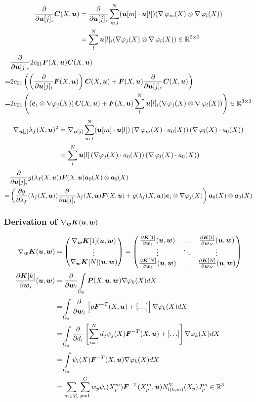 \begin{align*}
	\d{}{\vu[j]_i}\vC(X,\vu) &= \d{}{\vu[j]_i}\suml{m,l}{N} (\vu[m] \cdot \vu[l])(\divergence\varphi_m(X) \otimes \divergence\varphi_l(X))\\
	&= \suml{l}{N} \vu[l]_i(\dpj \otimes \divergence\varphi_l(X))\in\R^{3\times 3}
\end{align*}
\begin{align*}
	&\d{}{\vu[j]_i}2c_{01}\vF(X,\vu)\vC(X,\vu)\\
	=& 2c_{01}\left(\left(\d{}{\vu[j]_i}\vF(X,\vu)\right)\vC(X,\vu) + \vF(X,\vu)\d{}{\vu[j]_i}\vC(X,\vu)\right)\\
	=& 2c_{01}\left(\left(\ve_i\otimes\dpj\right)\vC(X,\vu)
	+ \vF(X,\vu)\suml{l}{N} \vu[l]_i(\dpj \otimes \divergence\varphi_l(X))\right)\in\R^{3\times 3}
\end{align*}
\begin{align*}
	\nabla_{\vu[j]}\lambda_f(X,\vu)^2 &= \nabla_{\vu[j]}\suml{m,l}{N} (\vu[m] \cdot \vu[l])\left(\divergence\varphi_m(X)\cdot a_0(X)\right)(\divergence\varphi_l(X)\cdot a_0(X))\\
	&= \suml{l}{N} \vu[l]\left(\dpj\cdot a_0(X)\right)(\divergence\varphi_l(X)\cdot a_0(X))\\
\end{align*}
\begin{align*}
	  & \d{}{\vu[j]_i} g(\lambda_f(X,\vu))\vF(X,\vu)\va_0(X)\otimes\va_0(X)\\
	 =& \left( \d{g}{\lambda_f}(\lambda_f(X,\vu))\d{}{\vu[j]_i}\lambda_f(X,\vu)\vF(X,\vu) + g(\lambda_f(X,\vu))\ve_i\otimes\dpj\right)\va_0(X)\otimes\va_0(X) 
\end{align*}

\subsubsection{Derivation of $\nabla_{\vw}\vK(\vu,\vw)$}
\begin{align*}
	\nabla_{\vw}\vK(\vu,\vw) &= \m{\nabla_{\vw}\vK[1](\vu,\vw)\\ \vdots \\ \nabla_{\vw}\vK[N](\vu,\vw)}
	 = \m{\d{\vK[1]}{\vw_1}(\vu,\vw) & \ldots & \d{\vK[1]}{\vw_N}(\vu,\vw)\\
	 	\vdots & \ddots & \vdots\\
	   \d{\vK[N]}{\vw_1}(\vu,\vw) & \ldots & \d{\vK[N]}{\vw_N}(\vu,\vw)}\\
	\d{\vK[k]}{\vw_i}(\vu,\vw) &= \d{}{\vw_i} \intor\vP(X,\vu,\vw)\dpk dX\\
		&=  \intor\d{}{\vw_i} \left[p\vF^{-T}(X,\vu) +[\ldots] \right] \dpk dX\\
		&=  \intor\d{}{d_i} \left[\sumi d_j\psi_j(X)\vF^{-T}(X,\vu) +[\ldots] \right] \dpk dX\\
		&=  \intor \psi_i(X)\vF^{-T}(X,\vu)\dpk dX\\
		&= \sumvk\sumgp w_p \psi_i(\pmp)\vF^{-T}(\pmp,\vu) \dNkmp\jmp\in\R^3
\end{align*}
